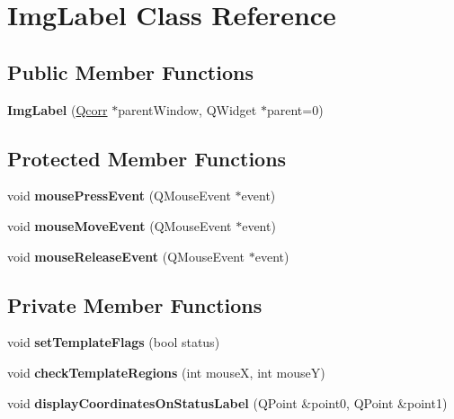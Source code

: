 \hypertarget{classImgLabel}{
\section{ImgLabel Class Reference}
\label{classImgLabel}
}
\subsection*{Public Member Functions}
\begin{DoxyCompactItemize}
\item 
\hypertarget{classImgLabel_a69e37830ecfccbd824166d03fc9c248d}{
{\bfseries ImgLabel} (\hyperlink{classQcorr}{Qcorr} $\ast$parentWindow, QWidget $\ast$parent=0)}
\label{classImgLabel_a69e37830ecfccbd824166d03fc9c248d}

\end{DoxyCompactItemize}
\subsection*{Protected Member Functions}
\begin{DoxyCompactItemize}
\item 
\hypertarget{classImgLabel_a20d52d626aa1a1d6cebe3f7e2c33e295}{
void {\bfseries mousePressEvent} (QMouseEvent $\ast$event)}
\label{classImgLabel_a20d52d626aa1a1d6cebe3f7e2c33e295}

\item 
\hypertarget{classImgLabel_a935514f1ec077f7c817fb057a16d8c4d}{
void {\bfseries mouseMoveEvent} (QMouseEvent $\ast$event)}
\label{classImgLabel_a935514f1ec077f7c817fb057a16d8c4d}

\item 
\hypertarget{classImgLabel_accc9e0b19e5e7873a8493f0d7e03c65b}{
void {\bfseries mouseReleaseEvent} (QMouseEvent $\ast$event)}
\label{classImgLabel_accc9e0b19e5e7873a8493f0d7e03c65b}

\end{DoxyCompactItemize}
\subsection*{Private Member Functions}
\begin{DoxyCompactItemize}
\item 
\hypertarget{classImgLabel_a8a433cfccabf949ad3e975af3f09c120}{
void {\bfseries setTemplateFlags} (bool status)}
\label{classImgLabel_a8a433cfccabf949ad3e975af3f09c120}

\item 
\hypertarget{classImgLabel_aa71c0202c48be349b4fb0813891df43a}{
void {\bfseries checkTemplateRegions} (int mouseX, int mouseY)}
\label{classImgLabel_aa71c0202c48be349b4fb0813891df43a}

\item 
\hypertarget{classImgLabel_af8fb1abf00b305d1ba4d8b4745b59692}{
void {\bfseries displayCoordinatesOnStatusLabel} (QPoint \&point0, QPoint \&point1)}
\label{classImgLabel_af8fb1abf00b305d1ba4d8b4745b59692}

\end{DoxyCompactItemize}
